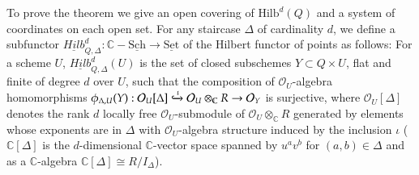 \documentclass{amsart}[12pt]
\theoremstyle{definition}
\theoremstyle{remark}
\numberwithin{equation}{section}
\newcommand{\To}{\longrightarrow}
\begin{document}
To prove the theorem we give an open covering of $\mathrm{Hilb}^d(Q)$ and a system of coordinates on each open set. For any staircase $\Delta$ of cardinality $d$, we define a subfunctor $\underline{Hilb}^d_{Q, \Delta}: \mathbb{C}-\underline{\mathrm{Sch}} \To \underline{\mathrm{Set}}$ of the Hilbert functor of points as follows: For a scheme $U$, $\underline{Hilb}^d_{Q, \Delta}(U)$ is the set of closed subschemes $Y \subset Q \times U$, flat and finite of degree $d$ over $U$, such that the composition of $\mathcal{O}_U$-algebra homomorphisms
$\phi_{\Delta, U}(Y): \mathcal{O}_U[\Delta] \xhookrightarrow{\iota} \mathcal{O}_U\otimes_{\mathbb{C}} R \rightarrow \mathcal{O}_Y$ is surjective, where $\mathcal{O}_U[\Delta]$ denotes the rank $d$ locally free $\mathcal{O}_U$-submodule of $\mathcal{O}_U\otimes_{\mathbb{C}} R$ generated by elements whose exponents are in $\Delta$ with $\mathcal{O}_U$-algebra structure induced by the inclusion $\iota$ ($\mathbb{C}[\Delta]$ is the $d$-dimensional $\mathbb{C}$-vector space spanned by $u^av^b$ for $(a, b) \in \Delta$ and as a $\mathbb{C}$-algebra $\mathbb{C}[\Delta] \cong R/I_{\Delta}$).
\end{document}
